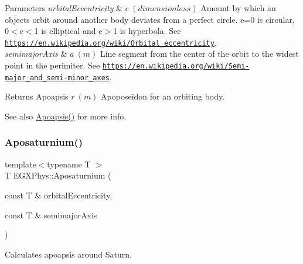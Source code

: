 \begin{DoxyParams}{Parameters}
{\em orbital\+Eccentricity} & $ e\ (dimensionless)$ Amount by which an objects orbit around another body deviates from a perfect circle. e=0 is circular, 0$<$e$<$1 is elliptical and e$>$1 is hyperbola. See \href{https://en.wikipedia.org/wiki/Orbital_eccentricity}{\tt https\+://en.\+wikipedia.\+org/wiki/\+Orbital\+\_\+eccentricity}. \\
\hline
{\em semimajor\+Axis} & $ a\ (m)$ Line segment from the center of the orbit to the widest point in the perimiter. See \href{https://en.wikipedia.org/wiki/Semi-major_and_semi-minor_axes}{\tt https\+://en.\+wikipedia.\+org/wiki/\+Semi-\/major\+\_\+and\+\_\+semi-\/minor\+\_\+axes}. \\
\hline
\end{DoxyParams}
\begin{DoxyReturn}{Returns}
Apoapsis $ r\ (m)$ Apoposeidon for an orbiting body. 
\end{DoxyReturn}
\begin{DoxySeeAlso}{See also}
\mbox{\hyperlink{group___e_g_x_phys-_apoapsis_gaf962e650bf84a568458e8eb39b1c61ba}{Apoapsis()}} for more info. 
\end{DoxySeeAlso}
\mbox{\label{group___e_g_x_phys-_apoapsis_gac157adc20a88c8616e4822eb819f9016}} 
\subsubsection{\texorpdfstring{Aposaturnium()}{Aposaturnium()}}
{\footnotesize\ttfamily template$<$typename T $>$ \\
T E\+G\+X\+Phys\+::\+Aposaturnium (\begin{DoxyParamCaption}\item[{const T \&}]{orbital\+Eccentricity,  }\item[{const T \&}]{semimajor\+Axis }\end{DoxyParamCaption})}



Calculates apoapsis around Saturn. 


